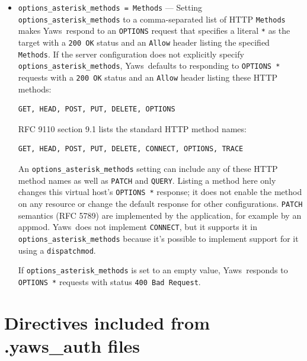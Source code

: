 \documentclass[11pt,oneside,english]{book}
\newcommand{\Yaws}            %
        {{\sc Yaws}}
\begin{document}
\begin{itemize}
\item       \verb+options_asterisk_methods = Methods+ ---
              Setting \verb+options_asterisk_methods+ to a
              comma-separated list of HTTP \verb+Methods+ makes
              \Yaws\ respond to an \verb+OPTIONS+ request that
              specifies a literal \verb+*+ as the target with a
              \verb+200 OK+ status and an \verb+Allow+ header listing
              the specified \verb+Methods+. If the server
              configuration does not explicitly specify
              \verb+options_asterisk_methods+, \Yaws\ defaults to
              responding to \verb+OPTIONS *+ requests with a
              \verb+200 OK+ status and an \verb+Allow+ header listing
              these HTTP methods:

\begin{verbatim}
GET, HEAD, POST, PUT, DELETE, OPTIONS
\end{verbatim}

              RFC 9110 section 9.1 lists the standard HTTP method
              names:
\begin{verbatim}
GET, HEAD, POST, PUT, DELETE, CONNECT, OPTIONS, TRACE
\end{verbatim}
              An \verb+options_asterisk_methods+ setting can include
              any of these HTTP method names as well as
              \verb+PATCH+ and \verb+QUERY+.
              Listing a method here only changes this virtual
              host's \verb+OPTIONS *+ response; it does not enable
              the method on any resource or change the default
              response for other configurations.
              \verb+PATCH+ semantics (RFC 5789) are implemented by the
              application, for example by an appmod. \Yaws\ does not implement
              \verb+CONNECT+, but it supports it in
              \verb+options_asterisk_methods+ because it's possible to
              implement support for it using a \verb+dispatchmod+.

              If \verb+options_asterisk_methods+ is set to an empty
              value, \Yaws\ responds to \verb+OPTIONS *+ requests with
              status \verb+400 Bad Request+.

\end{itemize}

\section{Directives included from .yaws\_auth files}
\end{document}

